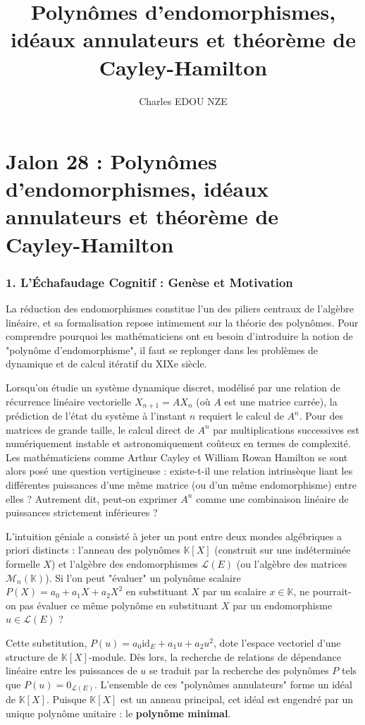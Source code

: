 \documentclass[11pt,a4paper]{article}
\title{Polynômes d'endomorphismes, idéaux annulateurs et théorème de Cayley-Hamilton}
\author{Charles EDOU NZE}
\date{}
\begin{document}
\maketitle
\tableofcontents
\newpage


\part{Jalon 28 : Polynômes d'endomorphismes, idéaux annulateurs et théorème de Cayley-Hamilton}

\section{1. L'Échafaudage Cognitif : Genèse et Motivation}

La réduction des endomorphismes constitue l'un des piliers centraux de l'algèbre linéaire, et sa formalisation repose intimement sur la théorie des polynômes. Pour comprendre pourquoi les mathématiciens ont eu besoin d'introduire la notion de "polynôme d'endomorphisme", il faut se replonger dans les problèmes de dynamique et de calcul itératif du XIXe siècle.

Lorsqu'on étudie un système dynamique discret, modélisé par une relation de récurrence linéaire vectorielle $X_{n+1} = A X_n$ (où $A$ est une matrice carrée), la prédiction de l'état du système à l'instant $n$ requiert le calcul de $A^n$. Pour des matrices de grande taille, le calcul direct de $A^n$ par multiplications successives est numériquement instable et astronomiquement coûteux en termes de complexité. Les mathématiciens comme Arthur Cayley et William Rowan Hamilton se sont alors posé une question vertigineuse : existe-t-il une relation intrinsèque liant les différentes puissances d'une même matrice (ou d'un même endomorphisme) entre elles ? Autrement dit, peut-on exprimer $A^n$ comme une combinaison linéaire de puissances strictement inférieures ?

L'intuition géniale a consisté à jeter un pont entre deux mondes algébriques a priori distincts : l'anneau des polynômes $\mathbb{K}[X]$ (construit sur une indéterminée formelle $X$) et l'algèbre des endomorphismes $\mathcal{L}(E)$ (ou l'algèbre des matrices $\mathcal{M}_n(\mathbb{K})$). Si l'on peut "évaluer" un polynôme scalaire $P(X) = a_0 + a_1 X + a_2 X^2$ en substituant $X$ par un scalaire $x \in \mathbb{K}$, ne pourrait-on pas évaluer ce même polynôme en substituant $X$ par un endomorphisme $u \in \mathcal{L}(E)$ ?

Cette substitution, $P(u) = a_0 \text{id}_E + a_1 u + a_2 u^2$, dote l'espace vectoriel d'une structure de $\mathbb{K}[X]$-module. Dès lors, la recherche de relations de dépendance linéaire entre les puissances de $u$ se traduit par la recherche des polynômes $P$ tels que $P(u) = 0_{\mathcal{L}(E)}$. L'ensemble de ces "polynômes annulateurs" forme un idéal de $\mathbb{K}[X]$. Puisque $\mathbb{K}[X]$ est un anneau principal, cet idéal est engendré par un unique polynôme unitaire : le \textbf{polynôme minimal}.
\end{document}
